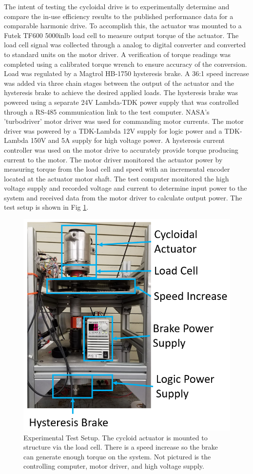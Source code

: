 The intent of testing the cycloidal drive is to experimentally determine and compare the in-use efficiency results to the published performance data for a comparable harmonic drive.
To accomplish this, the actuator was mounted to a Futek TF600 5000inlb load cell to measure output torque of the actuator.
The load cell signal was collected through a analog to digital converter and converted to standard units on the motor driver.
A verification of torque readings was completed using a calibrated torque wrench to ensure accuracy of the conversion.
Load was regulated by a Magtrol HB-1750 hysteresis brake.
A 36:1 speed increase was added via three chain stages between the output of the actuator and the hysteresis brake to achieve the desired applied loads.
The hysteresis brake was powered using a separate 24V Lambda-TDK power supply that was controlled through a RS-485 communication link to the test computer.
NASA's 'turbodriver' motor driver was used for commanding motor currents.
The motor driver was powered by a TDK-Lambda 12V supply for logic power and a TDK-Lambda 150V and 5A supply for high voltage power.
A hysteresis current controller was used on the motor drive to accurately provide torque producing current to the motor.
The motor driver monitored the actuator power by measuring torque from the load cell and speed with an incremental encoder located at the actuator motor shaft.
The test computer monitored the high voltage supply and recorded voltage and current to determine input power to the system and received data from the motor driver to calculate output power.
The test setup is shown in Fig \ref{fig:test_setup}.

\begin{figure}[t]
   \centering
   \includegraphics[width=0.75\linewidth]{fig/test_stand}
   \caption{Experimental Test Setup.
   The cycloid actuator is mounted to structure via the load cell.
   There is a speed increase so the brake can generate enough torque on the system.
   Not pictured is the controlling computer, motor driver, and high voltage supply.}
   \label{fig:test_setup}
\end{figure}

